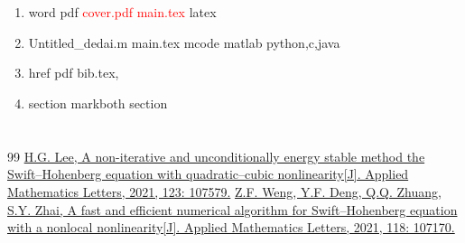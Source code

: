 \documentclass{article}
\begin{document}
    \newpage
    \section{ }
    \markboth{\text{ }\thesection\text{ } \quad  }{\text{ }\thesection\text{ } \quad  }  

     

    \begin{enumerate}[1)]
    \item  word pdf \textcolor{red}{ cover.pdf main.tex } latex 
    \item  Untitled\_dedai.m main.tex mcode matlab python,c,java 
    \item  href pdf bib.tex, 
    \item  section markboth section 
    \end{enumerate}






    \newpage
    \section*{ }
     
    

    \textcolor{red}{ }



    \newpage
    \section*{ }
    \begingroup  %
    \renewcommand{\section}[2]{} 

    \begin{thebibliography}{99}
        \addtolength{\itemsep}{0em} %
        \setlength{\itemsep}{0pt}
        \href{https://www.sciencedirect.com/science/article/pii/S0893965921003098}{H.G. Lee, A non-iterative and unconditionally energy stable method the Swift--Hohenberg equation with quadratic--cubic nonlinearity[J]. Applied Mathematics Letters, 2021, 123: 107579.}
        \href{https://www.sciencedirect.com/science/article/pii/S0893965921000847}{Z.F. Weng, Y.F. Deng, Q.Q. Zhuang, S.Y. Zhai, A fast and efficient numerical algorithm for Swift--Hohenberg equation with a nonlocal nonlinearity[J]. Applied Mathematics Letters, 2021, 118: 107170.}

    \end{thebibliography}
    
\end{document}
